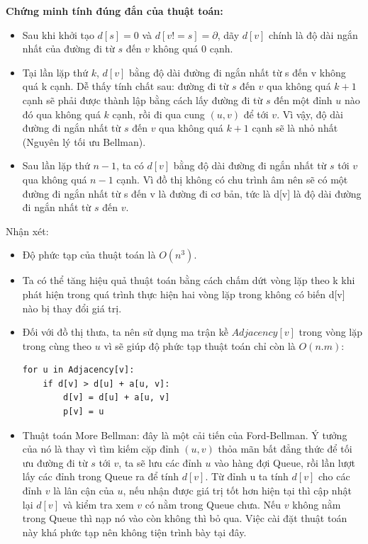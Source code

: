 \documentclass[a4paper,12pt]{report}
\begin{document}
\textbf{Chứng minh tính đúng đắn của thuật toán:}
\begin{itemize}

	\item Sau khi khởi tạo $ d[s] = 0 $ và $ d[v != s] = \partial $, dãy $ d[v] $ chính là độ dài ngắn nhất của đường đi từ $s$ đến $v$ không quá $0$ cạnh.
	\item Tại lần lặp thứ $k$, $d[v]$ bằng độ dài đường đi ngắn nhất từ s đến v không quá k cạnh. Dễ thấy tính chất sau: đường đi từ $s$ đến $v$ qua không quá $ k + 1 $ cạnh sẽ phải được thành lập bằng cách lấy đường đi từ $s$ đến một đỉnh $u$ nào đó qua không quá $k$ cạnh, rồi đi qua cung $ (u, v) $ để tới $ v $. Vì vậy, độ dài đường đi ngắn nhất từ $s$ đến $v$ qua không quá $ k+1 $ cạnh sẽ là nhỏ nhất (Nguyên lý tối ưu Bellman).
	\item Sau lần lặp thứ $ n-1 $, ta có $ d[v] $  bằng độ dài đường đi ngắn nhất từ $s$ tới $v$ qua không quá $ n-1 $ cạnh. Vì đồ thị không có chu trình âm nên sẽ có một đường đi ngắn nhất từ s đến v là đường đi cơ bản, tức là d[v] là độ dài đường đi ngắn nhất từ $s$ đến $v$.

\end{itemize}
Nhận xét:
\begin{itemize}

	\item Độ phức tạp của thuật toán là $ O(n^{3}) $.
	\item Ta có thể tăng hiệu quả thuật toán bằng cách chấm dứt vòng lặp theo k khi phát hiện trong quá trình thực hiện hai vòng lặp trong không có biến d[v] nào bị thay đổi giá trị.
	\item Đối với đồ thị thưa, ta nên sử dụng ma trận kề $ Adjacency[v] $ trong vòng lặp trong cùng theo $u$ vì sẽ giúp độ phức tạp thuật toán chỉ còn là $ O(n.m) $:\\
\begin{verbatim}		
for u in Adjacency[v]:
    if d[v] > d[u] + a[u, v]:
        d[v] = d[u] + a[u, v]
        p[v] = u
\end{verbatim}
	\item Thuật toán More Bellman: đây là một cải tiến của Ford-Bellman. Ý tưởng của nó là thay vì tìm kiếm cặp đỉnh $ (u, v) $ thỏa mãn bất đẳng thức để tối ưu đường đi từ $s$ tới $v$, ta sẽ lưu các đỉnh $u$ vào hàng đợi Queue, rồi lần lượt lấy các đỉnh trong Queue ra để tính $ d[v] $. Từ đỉnh u ta tính $ d[v] $ cho các đỉnh $ v $ là lân cận của $ u $, nếu nhận được giá trị tốt hơn hiện tại thì cập nhật lại $ d[v] $ và kiểm tra xem $ v $ có nằm trong Queue chưa. Nếu $ v $ không nằm trong Queue thì nạp nó vào còn không thì bỏ qua. Việc cài đặt thuật toán này khá phức tạp nên không tiện trình bày tại đây.

\end{itemize}
\end{document}
